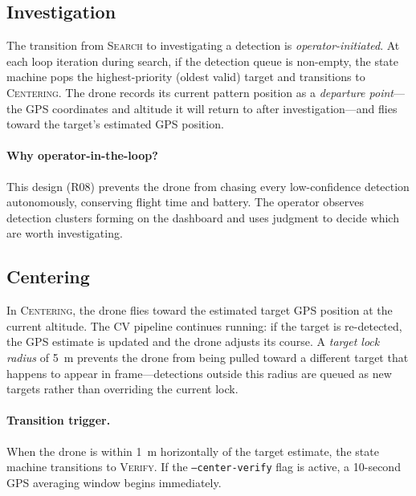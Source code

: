 \subsection{Investigation}\label{sec:mf-investigation}

The transition from \textsc{Search} to investigating a detection is \emph{operator-initiated}.  At each loop iteration during search, if the detection queue is non-empty, the state machine pops the highest-priority (oldest valid) target and transitions to \textsc{Centering}.  The drone records its current pattern position as a \emph{departure point}---the GPS coordinates and altitude it will return to after investigation---and flies toward the target's estimated GPS position.

\paragraph{Why operator-in-the-loop?}  This design (R08) prevents the drone from chasing every low-confidence detection autonomously, conserving flight time and battery.  The operator observes detection clusters forming on the dashboard and uses judgment to decide which are worth investigating.

\subsection{Centering}\label{sec:mf-centering}

In \textsc{Centering}, the drone flies toward the estimated target GPS position at the current altitude.  The CV pipeline continues running: if the target is re-detected, the GPS estimate is updated and the drone adjusts its course.  A \emph{target lock radius} of \SI{5}{\metre} prevents the drone from being pulled toward a different target that happens to appear in frame---detections outside this radius are queued as new targets rather than overriding the current lock.

\paragraph{Transition trigger.}  When the drone is within \SI{1}{\metre} horizontally of the target estimate, the state machine transitions to \textsc{Verify}.  If the \texttt{--center-verify} flag is active, a 10-second GPS averaging window begins immediately.


